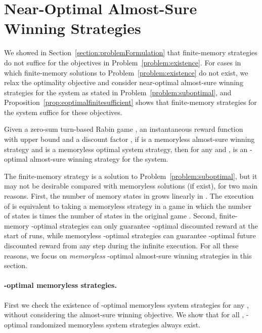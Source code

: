 \documentclass[runningheads,a4paper]{llncs}
\begin{document}
\section{Near-Optimal Almost-Sure Winning Strategies}
\label{section:nearoptimal}





We showed in Section~\ref{section:problemFormulation} that finite-memory strategies do not suffice for the objectives in Problem~\ref{problem:existence}. For cases in which finite-memory solutions to Problem~\ref{problem:existence} do not exist, we relax the optimality objective and consider near-optimal almost-sure winning strategies for the system as stated in Problem~\ref{problem:suboptimal}, and Proposition~\ref{prop:eoptimalfinitesufficient} shows that finite-memory strategies for the system suffice for these objectives. 

\begin{proposition}
Given a zero-sum turn-based Rabin game , an instantaneous reward function  with upper bound  and a discount factor , if  is a memoryless almost-sure winning strategy and  is a memoryless optimal system strategy, then for any  and ,  is an -optimal almost-sure winning strategy for the system. 
\label{prop:eoptimalfinitesufficient}
\end{proposition}

The finite-memory strategy  is a solution to Problem~\ref{problem:suboptimal}, but it may not be desirable compared with memoryless solutions (if exist), for two main reasons.
First, the number of memory states  in  grows linearly in . 
The execution of  is equivalent to taking a memoryless strategy in a game in which the number of states is  times the number of states in the original game . Second, finite-memory -optimal strategies can only guarantee -optimal discounted reward at the start of runs, while memoryless -optimal strategies can guarantee -optimal future discounted reward from any step during the infinite execution. For all these reasons, we focus on \emph{memoryless} -optimal almost-sure winning strategies in this section. 











\paragraph{-optimal memoryless strategies.}
First we check the existence of -optimal memoryless system strategies for any , without considering the almost-sure winning objective. 
We show that for all , -optimal randomized memoryless system strategies always exist. 
\end{document}
